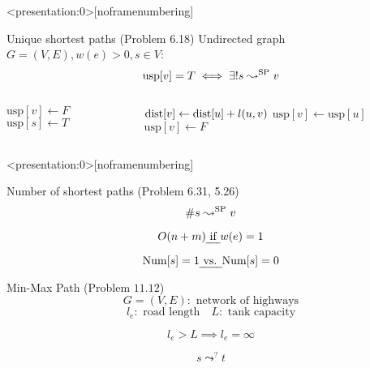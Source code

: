 
\begin{frame}
  \centerline{}
\end{frame}

\begin{frame}<presentation:0>[noframenumbering]
  \begin{exampleblock}{Unique shortest paths (Problem 6.18)}
    Undirected graph $G = (V, E), w(e) > 0, s \in V$:
    \[
      \text{usp}[v] = T \iff \exists! s \leadsto^{\text{SP}} v 
    \]
  \end{exampleblock}

  \begin{columns}[t]
      \begin{algorithmic}
	  \State $\text{usp}[v] \gets F$
	\EndFor
	\State $\text{usp}[s] \gets T$
      \end{algorithmic}
      \begin{algorithmic}
	  \State $\text{dist}[v] \gets \text{dist}[u] + l(u,v)$
	  \State $\text{usp}[v] \gets \text{usp}[u]$
	  \State $\text{usp}[v] \gets F$
	\EndIf
      \end{algorithmic}
  \end{columns}
\end{frame}
\begin{frame}<presentation:0>[noframenumbering]
  \begin{exampleblock}{Number of shortest paths (Problem 6.31, 5.26)}
    \[
      \# s \leadsto^{\text{SP}} v
    \]

    \[
      O(n + m) \text{\emph{ if }} w(e) = 1
    \]
  \end{exampleblock}

  \[
    \text{Num}[s] = 1 \text{\emph{ vs. }} \text{Num}[s] = 0
  \]
\end{frame}

\begin{frame}{}
  \begin{exampleblock}{Min-Max Path (Problem $11.12$)}
    \[
      G = (V, E): \text{ network of highways}
    \]
    \[
      l_e: \text{ road length} \quad L: \text{ tank capacity}
    \]

    \vspace{0.30cm}
    \centerline{}
  \end{exampleblock}

  \pause
  \[
    l_e > L \implies l_e = \infty
  \]

  \pause
  \[
    s \leadsto^{?} t
  \]
\end{frame}

